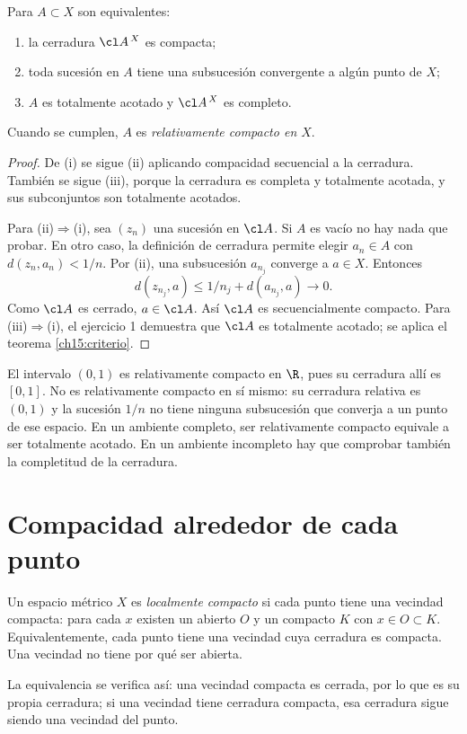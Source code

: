 \begin{proposicion}\label{ch15:relativa}
Para $A\subset X$ son equivalentes:
\begin{enumerate}[label=(\roman*)]
\item la cerradura $\cl A^{\,X}$ es compacta;
\item toda sucesión en $A$ tiene una subsucesión convergente a algún punto de $X$;
\item $A$ es totalmente acotado y $\cl A^{\,X}$ es completo.
\end{enumerate}
Cuando se cumplen, $A$ es \emph{relativamente compacto en $X$}.
\end{proposicion}
\begin{proof}
De (i) se sigue (ii) aplicando compacidad secuencial a la cerradura. También se sigue (iii), porque la cerradura es completa y totalmente acotada, y sus subconjuntos son totalmente acotados.

Para (ii)$\Rightarrow$(i), sea $(z_n)$ una sucesión en $\cl A$. Si $A$ es vacío no hay nada que probar. En otro caso, la definición de cerradura permite elegir $a_n\in A$ con $d(z_n,a_n)<1/n$. Por (ii), una subsucesión $a_{n_j}$ converge a $a\in X$. Entonces
\[
d(z_{n_j},a)\le 1/n_j+d(a_{n_j},a)\longrightarrow0.
\]
Como $\cl A$ es cerrado, $a\in\cl A$. Así $\cl A$ es secuencialmente compacto. Para (iii)$\Rightarrow$(i), el ejercicio 1 demuestra que $\cl A$ es totalmente acotado; se aplica el teorema \ref{ch15:criterio}.
\end{proof}

\begin{ejemplo}
El intervalo $(0,1)$ es relativamente compacto en $\R$, pues su cerradura allí es $[0,1]$. No es relativamente compacto en sí mismo: su cerradura relativa es $(0,1)$ y la sucesión $1/n$ no tiene ninguna subsucesión que converja a un punto de ese espacio. En un ambiente completo, ser relativamente compacto equivale a ser totalmente acotado. En un ambiente incompleto hay que comprobar también la completitud de la cerradura.
\end{ejemplo}

\section{Compacidad alrededor de cada punto}
\begin{definicion}
Un espacio métrico $X$ es \emph{localmente compacto} si cada punto tiene una vecindad compacta: para cada $x$ existen un abierto $O$ y un compacto $K$ con $x\in O\subset K$. Equivalentemente, cada punto tiene una vecindad cuya cerradura es compacta. Una vecindad no tiene por qué ser abierta.
\end{definicion}
La equivalencia se verifica así: una vecindad compacta es cerrada, por lo que es su propia cerradura; si una vecindad tiene cerradura compacta, esa cerradura sigue siendo una vecindad del punto.

